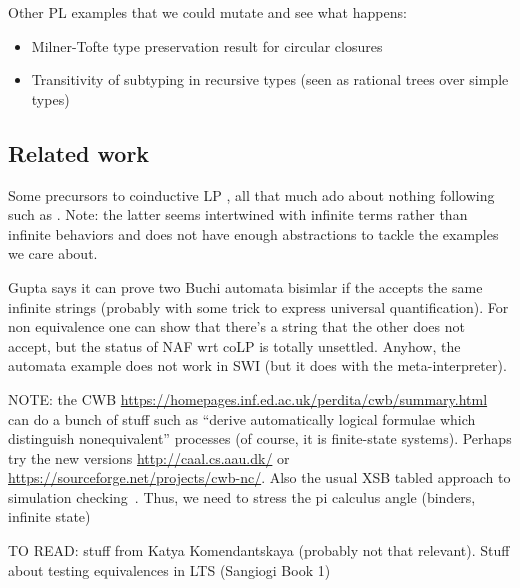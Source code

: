 \documentclass[sigconf]{acmart}
\begin{document}
  
  Other PL examples that we could mutate and see what happens:
\begin{itemize}  

\item Milner-Tofte type preservation result for circular closures~\cite{milner91tcs}
\item Transitivity of subtyping in recursive types (seen as rational trees over simple types)
  \cite{kozen_silva_2017}
\end{itemize}

\subsection{Related work}

Some precursors to coinductive LP \cite{JaffarSV04,CharatonikMNPW98},
all that much ado about nothing following \cite{Luke07} such as
\cite{DBLP:journals/cl/Ancona13,MantadelisRM14}. Note: the latter
seems intertwined with infinite terms rather than infinite behaviors
and does not have enough abstractions to tackle the examples we care
about.

Gupta says it can prove two Buchi automata bisimlar if the accepts the
same infinite strings (probably with some trick to express universal
quantification). For non equivalence one can show that there's a
string that the other does not accept, but the status of NAF wrt coLP
is totally unsettled. Anyhow, the automata example does not work in
SWI (but it does with the meta-interpreter).

NOTE: the CWB
\url{https://homepages.inf.ed.ac.uk/perdita/cwb/summary.html} can do a
bunch of stuff such as ``derive automatically logical formulae which
distinguish nonequivalent'' processes (of course, it is finite-state
systems). Perhaps try the new versions \url{http://caal.cs.aau.dk/}
\cite{CAAL} or \url{https://sourceforge.net/projects/cwb-nc/}. Also
the usual XSB tabled approach to simulation checking~\cite{symbolic}. Thus, we need to stress the pi calculus angle (binders, infinite state)

TO READ: stuff from Katya Komendantskaya \cite{KomendantskayaL17,BasoldKL19} (probably not that relevant). Stuff about testing equivalences in LTS (Sangiogi Book 1)


\end{document}
